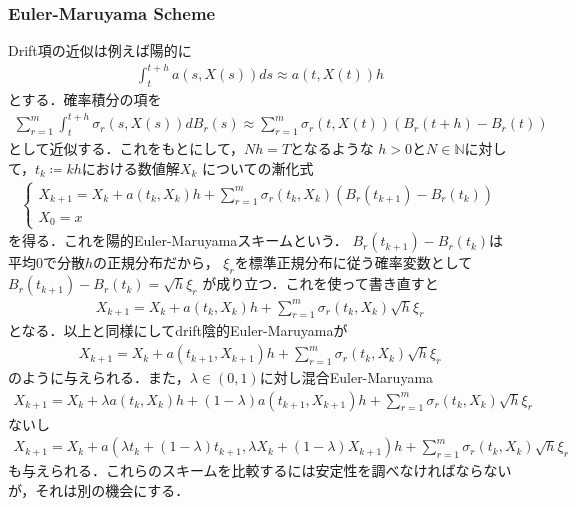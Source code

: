\documentclass[dvipdfmx,autodetect-engine]{jsarticle}
\theoremstyle{remark}
\theoremstyle{definition}
\newcommand{\N}{\mathbb{N}}
\begin{document}
\subsubsection{Euler-Maruyama Scheme}
Drift項の近似は例えば陽的に
\begin{align}
    \int_{t}^{t+h} a(s,X(s))ds \approx a(t,X(t))h
\end{align}
とする．確率積分の項を
\begin{align}
    \sum_{r=1}^{m} \int_{t}^{t+h} \sigma_{r}(s,X(s))dB_{r}(s)
    \approx \sum_{r=1}^{m} \sigma_{r}(t,X(t)) (B_{r}(t+h) - B_{r}(t))
\end{align}
として近似する．これをもとにして，$Nh = T$となるような
$h>0$と$N \in \N$に対して，$t_{k}\coloneqq  kh$における数値解$X_{k}$
についての漸化式
\begin{align}
    \begin{cases}
        X_{k+1} = X_{k} + a(t_{k},X_{k})h 
        + \sum_{r=1}^{m} \sigma_{r}(t_{k},X_{k}) (B_{r}(t_{k+1}) - B_{r}(t_{k}))\\
        X_{0} = x
    \end{cases}
\end{align}
を得る．これを陽的Euler-Maruyamaスキームという．
$B_{r}(t_{k+1}) - B_{r}(t_{k})$は平均$0$で分散$h$の正規分布だから，
$\xi_{r}$を標準正規分布に従う確率変数として$B_{r}(t_{k+1}) - B_{r}(t_{k}) = \sqrt{h} \xi_{r}$
が成り立つ．これを使って書き直すと
\begin{align}
    X_{k+1} = X_{k} + a(t_{k},X_{k})h 
    + \sum_{r=1}^{m} \sigma_{r}(t_{k},X_{k}) \sqrt{h} \xi_{r} \label{Euler_Maruyama}
\end{align}
となる．以上と同様にしてdrift陰的Euler-Maruyamaが
\begin{align}
    X_{k+1} = X_{k} + a(t_{k+1},X_{k+1})h 
    + \sum_{r=1}^{m} \sigma_{r}(t_{k},X_{k}) \sqrt{h} \xi_{r}
\end{align}
のように与えられる．また，$\lambda \in (0,1)$に対し混合Euler-Maruyama
\begin{align}
    X_{k+1} = X_{k} + \lambda a(t_{k},X_{k})h + (1-\lambda) a(t_{k+1},X_{k+1})h 
    + \sum_{r=1}^{m} \sigma_{r}(t_{k},X_{k}) \sqrt{h} \xi_{r}
\end{align}
ないし
\begin{align}
    X_{k+1} = X_{k} + a(\lambda t_k + (1-\lambda)t_{k+1}, \lambda X_{k} + (1-\lambda)X_{k+1})h
    + \sum_{r=1}^{m} \sigma_{r}(t_{k},X_{k}) \sqrt{h} \xi_{r}
\end{align}
も与えられる．これらのスキームを比較するには安定性を調べなければならないが，それは別の機会にする．
\end{document}
